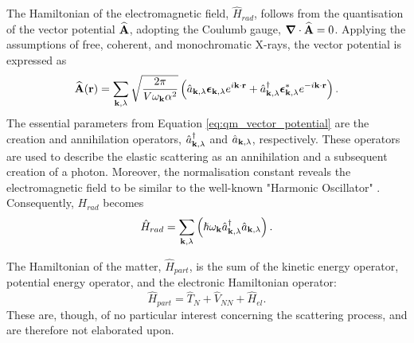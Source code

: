 The Hamiltonian of the electromagnetic field, $\hat{H}_{rad}$, follows from the quantisation of the vector potential $\bm{\mathrm{\widehat{A}}}$, adopting the Coulumb gauge, $\bm{\mathrm{\nabla}} \cdot \bm{\mathrm{\widehat{A}}} = 0$.
Applying the assumptions of free, coherent, and monochromatic X-rays, the vector potential is expressed as
\begin{equation}\label{eq:qm_vector_potential}
    \bm{\mathrm{\widehat{A}}}(\bm{\mathrm{r}}) = \sum_{\bm{\mathrm{k}}, \lambda} \sqrt{\frac{2 \pi}{V \omega_{\bm{\mathrm{k}}} \alpha^{2}  }} \left( \hat{a}_{\bm{\mathrm{k}},\lambda} \mathrm{\boldsymbol{\epsilon}}_{\bm{\mathrm{k}},\lambda} e^{i \bm{\mathrm{k}}\cdot\bm{\mathrm{r}}} + \hat{a}_{\bm{\mathrm{k}},\lambda}^{\dagger} \mathrm{\boldsymbol{\epsilon}}_{\bm{\mathrm{k}},\lambda}^{*} e^{-i \bm{\mathrm{k}}\cdot\bm{\mathrm{r}}}  \right).
\end{equation}
The essential parameters from Equation \eqref{eq:qm_vector_potential} are the creation and annihilation operators, $\hat{a}_{\bm{\mathrm{k}},\lambda}^{\dagger}$ and $\hat{a}_{\bm{\mathrm{k}},\lambda}$, respectively.
These operators are used to describe the elastic scattering as an annihilation and a subsequent creation of a photon.
Moreover, the normalisation constant reveals the electromagnetic field to be similar to the well-known "Harmonic Oscillator" \cite{mcmorrow2011elements}. Consequently, $H_{rad}$ becomes
\begin{equation}
    \hat{H}_{rad} = \sum_{\bm{\mathrm{k}}, \lambda} \left( \hslash \omega_{\bm{\mathrm{k}}} \hat{a}_{\bm{\mathrm{k}},\lambda}^{\dagger} \hat{a}_{\bm{\mathrm{k}},\lambda}  \right).
\end{equation}

The Hamiltonian of the matter, $\hat{H}_{part}$, is the sum of the kinetic energy operator, potential energy operator, and the electronic Hamiltonian operator:
\begin{equation}\label{eq:qm_Hamiltonian_matter}
    \hat{H}_{part} = \hat{T}_{N} + \hat{V}_{NN} + \hat{H}_{el}.
\end{equation}
These are, though, of no particular interest concerning the scattering process, and are therefore not elaborated upon.

